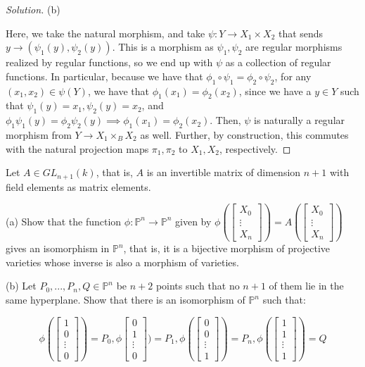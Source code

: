 \documentclass[10pt]{article}
\newenvironment{problem}[2][Problem]{\begin{trivlist}
\item[\hskip \labelsep {\bfseries #1}\hskip \labelsep {\bfseries #2.}]}{\end{trivlist}}
\begin{document}
\begin{proof}[Solution]
(b)

Here, we take the natural morphism, and take $\psi: Y \to X_1 \times X_2$ that sends $y \to (\psi_1(y),\psi_2(y))$. This is a morphism as $\psi_1,\psi_2$ are regular morphisms realized by regular functions, so we end up with $\psi$ as a collection of regular functions. In particular, because we have that $\phi_1 \circ \psi_1 = \phi_2 \circ \psi_2$, for any $(x_1,x_2) \in \psi(Y)$, we have that $\phi_1(x_1) = \phi_2(x_2)$, since we have a $y \in Y$ such that $\psi_1(y) = x_1, \psi_2(y) = x_2$, and $\phi_1\psi_1(y) = \phi_2\psi_2(y) \implies \phi_1(x_1) = \phi_2(x_2)$. Then, $\psi$ is naturally a regular morphism from $Y \to X_1 \times_B X_2$ as well. Further, by construction, this commutes with the natural projection maps $\pi_1,\pi_2$ to $X_1,X_2$, respectively. 

\end{proof}

\begin{problem}{5.3}

Let $ A \in GL_{n+1} (k)$, that is, $A$ is an invertible matrix of dimension $n+1$ with field elements as matrix elements.

(a) Show that the function $\phi: \mathbb{P}^n \to \mathbb{P}^n$ given by $\phi(\begin{bmatrix} X_0 \\ \vdots \\ X_n \end{bmatrix}) = A(\begin{bmatrix} X_0 \\ \vdots \\ X_n \end{bmatrix})$ gives an isomorphism in $\mathbb{P}^n$, that is, it is a bijective morphism of projective varieties whose inverse is also a morphism of varieties.

(b) Let $P_0,...,P_n, Q \in \mathbb{P}^n$ be $n+2$ points such that no $n+1$ of them lie in the same hyperplane. Show that there is an isomorphism of $\mathbb{P}^n$ such that:

$$\phi(\begin{bmatrix} 1 \\ 0 \\ \vdots \\ 0 \end{bmatrix}) = P_0, \phi\begin{bmatrix} 0 \\ 1 \\ \vdots \\ 0 \end{bmatrix}) = P_1, \phi(\begin{bmatrix} 0 \\ 0 \\ \vdots \\ 1 \end{bmatrix}) = P_n, \phi(\begin{bmatrix} 1 \\ 1 \\ \vdots \\ 1 \end{bmatrix}) = Q $$ 

\end{problem}
\end{document}
